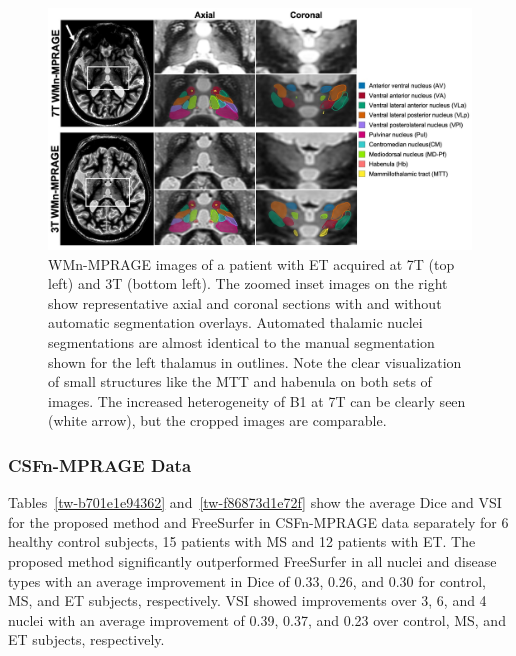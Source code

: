 \documentclass[3p,,final,12pt]{elsarticle}
\begin{document}
\bgroup
{}
\begin{figure}[!htbp]
\centering \includegraphics{Thalamus/images/slide4.jpeg}
\makeatother 
\caption{WMn-MPRAGE images of a patient with ET acquired at 7T (top left) and 3T (bottom left). The zoomed inset images on the right show representative axial and coronal sections with and without automatic segmentation overlays. Automated thalamic nuclei segmentations are almost identical to the manual segmentation shown for the left thalamus in outlines. Note the clear visualization of small structures like the MTT and habenula on both sets of images. The increased heterogeneity of B1 at 7T can be clearly seen (white arrow), but the cropped images are comparable. }
\label{f-4d03d5d032a5}
\end{figure}
\egroup




\subsubsection{CSFn-MPRAGE Data }Tables~\ref{tw-b701e1e94362} and~\ref{tw-f86873d1e72f} show the average Dice and VSI for the proposed method and FreeSurfer in CSFn-MPRAGE data separately for 6 healthy control subjects, 15 patients with MS and 12 patients with ET. The proposed method significantly outperformed FreeSurfer in all nuclei and disease types with an average improvement in Dice of 0.33, 0.26, and 0.30 for control, MS, and ET subjects, respectively. VSI showed improvements over 3, 6, and 4 nuclei with an average improvement of 0.39, 0.37, and 0.23 over control, MS, and ET subjects, respectively.
\end{document}
